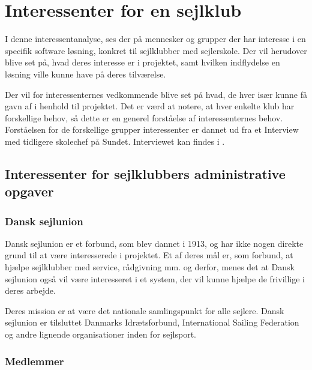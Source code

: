 \chapter{Interessenter for en sejlklub}\label{chap:interessent-analyse-ved-sejlklubber}

I denne interessentanalyse, ses der på mennesker og grupper der har interesse i en specifik software løsning, konkret
til sejlklubber med sejlerskole. Der vil herudover blive set på, hvad deres interesse er i projektet, samt hvilken
indflydelse en løsning ville kunne have på deres tilværelse.


Der vil for interessenternes vedkommende blive set på hvad, de hver især kunne få gavn af i henhold til projektet. 
Det er værd at notere, at hver enkelte klub har forskellige behov, så dette er en generel forståelse af interessenternes
behov. Forståelsen for de forskellige grupper interessenter er dannet ud fra et Interview med tidligere skolechef på
Sundet. Interviewet kan findes i .

\section{Interessenter for sejlklubbers administrative opgaver}

\subsection{Dansk sejlunion}

Dansk sejlunion er et forbund, som blev dannet i 1913, og har ikke nogen direkte grund til at være interesserede i
projektet. 
Et af deres mål er, som forbund, at hjælpe sejlklubber med service, rådgivning mm. og derfor, menes det at Dansk sejlunion
også vil være interesseret i et system, der vil kunne hjælpe de frivillige i deres arbejde.

Deres mission er at være det nationale samlingspunkt for alle sejlere. Dansk sejlunion er tilsluttet Danmarks
Idrætsforbund, International Sailing Federation og andre lignende organisationer inden for sejlsport.
\citep{Sejlsportdk}


\subsection{Medlemmer}

